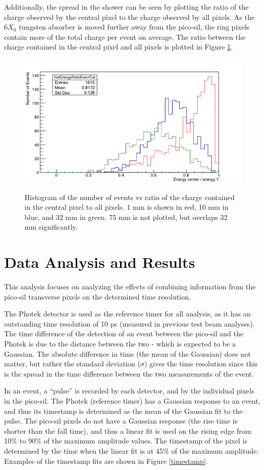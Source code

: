 \documentclass[twocolumn,aps,prd,reprint]{revtex4-1}
\begin{document}
Additionally, the spread in the shower can be seen by plotting the ratio of the charge observed by the central pixel to the charge observed by all pixels. As the $6X_0$ tungsten absorber is moved further away from the pico-sil, the ring pixels contain more of the total charge per event on average. The ratio between the charge contained in the central pixel and all pixels is plotted in Figure \ref{charge ratios}.

\begin{figure}[!htbp]
{\includegraphics[width = .5\textwidth]{center_all_ratio}} 
\caption{Histogram of the number of events vs ratio of the charge contained in the central pixel to all pixels. 1 mm is shown in red, 10 mm in blue, and 32 mm in green. 75 mm is not plotted, but overlaps 32 mm significantly.}
\label{charge ratios}
\end{figure}

\section{Data Analysis and Results}

This analysis focuses on analyzing the effects of combining information from the pico-sil transverse pixels on the determined time resolution.

The Photek detector is used as the reference timer for all analysis, as it has an outstanding time resolution of 10 ps (measured in previous test beam analyses). The time difference of the detection of an event between the pico-sil and the Photek is due to the distance between the two - which is expected to be a Gaussian. The absolute difference in time (the mean of the Gaussian) does not matter, but rather the standard deviation ($\sigma$) gives the time resolution since this is the spread in the time difference between the two measurements of the event.

In an event, a ``pulse'' is recorded by each detector, and by the individual pixels in the pico-sil. The Photek (reference timer) has a Gaussian response to an event, and thus its timestamp is determined as the mean of the Gaussian fit to the pulse. The pico-sil pixels do not have a Gaussian response (the rise time is shorter than the fall time), and thus a linear fit is used on the rising edge from 10\% to 90\% of the maximum amplitude values. The timestamp of the pixel is determined by the time when the linear fit is at 45\% of the maximum amplitude. Examples of the timestamp fits are shown in Figure \ref{timestamp}.
\end{document}

